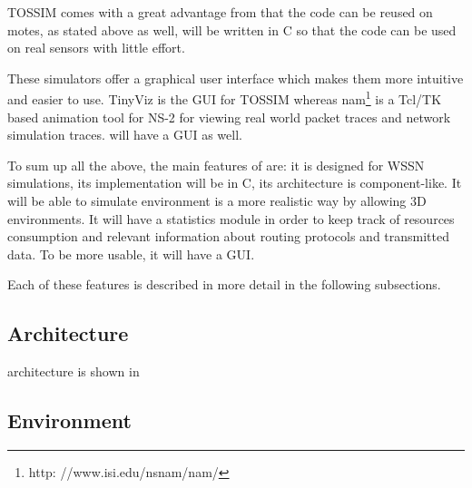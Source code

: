 TOSSIM comes with a great advantage from that the code can be reused on motes,
as stated above as well, \codename will be written in C so that the code can be
used on real sensors with little effort.   

These simulators offer a graphical user interface which makes them more intuitive
and easier to use. TinyViz is the GUI for TOSSIM whereas nam\footnote{http:
//www.isi.edu/nsnam/nam/} is a Tcl/TK based
animation tool for NS-2 for viewing real world packet traces and network simulation
traces. \codename will have a GUI as well.

To sum up all the above, the main features of \codename are: it is designed for WSSN simulations, 
its implementation will be in C, its architecture is component-like. It will be able to simulate
environment is a more realistic way by allowing 3D environments. It will have a statistics module
in order to keep track of resources consumption and relevant information about routing protocols
and transmitted data. To be more usable, it will have a GUI. 

Each of these features is described in more detail in the following subsections.

\subsection{Architecture}
\codename architecture is shown in 

\subsection{Environment}

